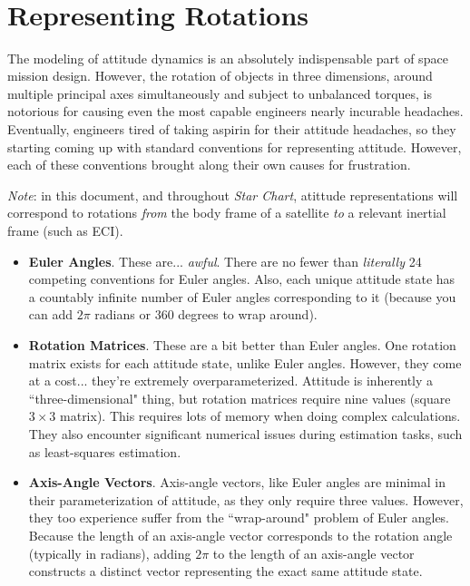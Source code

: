\documentclass[12pt]{article}
\title{{\Large \thetopicname} \\ \textsc{\thelecturename}}
\author{\thelecturer \\ \href{mailto:\thelectureremail}{\thelectureremail}}
\date{\thelecturedate}
\begin{document}
	\maketitle
	\tableofcontents
	
    \section{Representing Rotations}
	
    The modeling of attitude dynamics is an absolutely indispensable part of space mission design.  However, the rotation of objects in three dimensions, around multiple principal axes simultaneously and subject to unbalanced torques, is notorious for causing even the most capable engineers nearly incurable headaches.  Eventually, engineers tired of taking aspirin for their attitude headaches, so they starting coming up with standard conventions for representing attitude.  However, each of these conventions brought along their own causes for frustration.

    \textit{Note}: in this document, and throughout \textit{Star Chart}, atittude representations will correspond to rotations \textit{from} the body frame of a satellite \textit{to} a relevant inertial frame (such as \textsc{ECI}).

    \begin{itemize}
        \item \textbf{Euler Angles}.  These are... \textit{awful}.  There are no fewer than \textit{literally} 24 competing conventions for Euler angles.  Also, each unique attitude state has a countably infinite number of Euler angles corresponding to it (because you can add \( 2\pi \) radians or \( 360 \) degrees to wrap around).
        \item \textbf{Rotation Matrices}.  These are a bit better than Euler angles.  One rotation matrix exists for each attitude state, unlike Euler angles.  However, they come at a cost... they're extremely overparameterized.  Attitude is inherently a ``three-dimensional" thing, but rotation matrices require nine values (square \( 3 \times 3 \) matrix).  This requires lots of memory when doing complex calculations.  They also encounter significant numerical issues during estimation tasks, such as least-squares estimation.
        \item \textbf{Axis-Angle Vectors}.  Axis-angle vectors, like Euler angles are minimal in their parameterization of attitude, as they only require three values.  However, they too experience suffer from the ``wrap-around" problem of Euler angles.  Because the length of an axis-angle vector corresponds to the rotation angle (typically in radians), adding \( 2 \pi \) to the length of an axis-angle vector constructs a distinct vector representing the exact same attitude state.
    \end{itemize}
\end{document}
